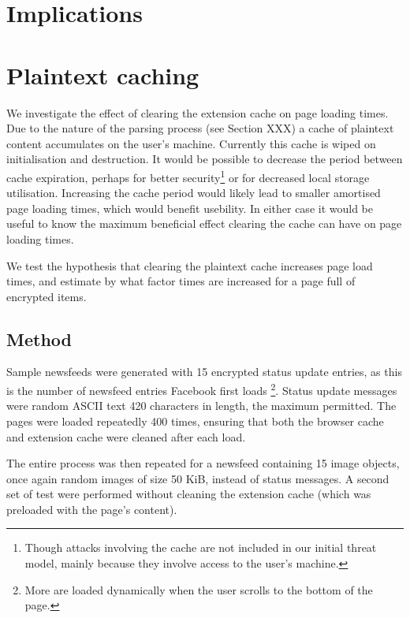 \section{Implications}





\section{Plaintext caching}

We investigate the effect of clearing the extension cache on page loading times. Due to the nature of the parsing process (see Section XXX) a cache of plaintext content accumulates on the user's machine. Currently this cache is wiped on initialisation and destruction. It would be possible to decrease the period between cache expiration, perhaps for better security\footnote{Though attacks involving the cache are not included in our initial threat model, mainly because they involve access to the user's machine.} or for decreased local storage utilisation. Increasing the cache period would likely lead to smaller amortised page loading times, which would benefit usebility. In either case it would be useful to know the maximum beneficial effect clearing the cache can have on page loading times.

We test the hypothesis that clearing the plaintext cache increases page load times, and estimate by what factor times are increased for a page full of encrypted items.


\subsection{Method}

Sample newsfeeds were generated with 15 encrypted status update entries, as this is the number of newsfeed entries Facebook first loads \footnote{More are loaded dynamically when the user scrolls to the bottom of the page.}. Status update messages were random ASCII text 420 characters in length, the maximum permitted. The pages were loaded repeatedly 400 times, ensuring that both the browser cache and extension cache were cleaned after each load.

The entire process was then repeated for a newsfeed containing 15 image objects, once again random images of size 50 KiB, instead of status messages. A second set of test were performed without cleaning the extension cache (which was preloaded with the page's content).

